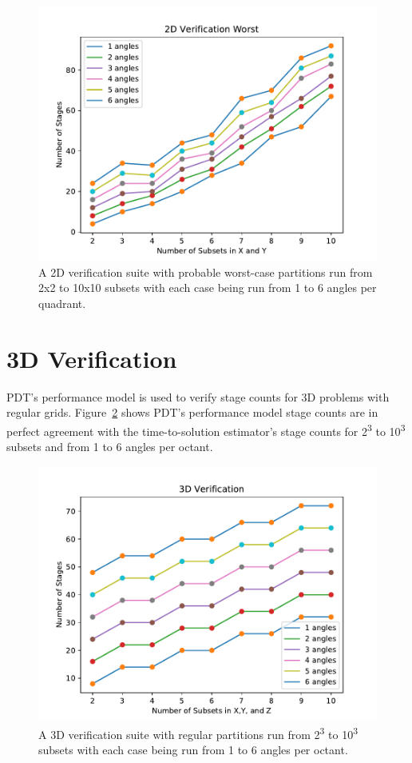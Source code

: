 \begin{figure}[H]
\centering
\includegraphics[scale=0.8]{../figures/worst_verification.pdf}
\caption{A 2D verification suite with probable worst-case partitions run from 2x2 to 10x10 subsets with each case being run from 1 to 6 angles per quadrant.}
\label{worst_verification}
\end{figure}

\section{3D Verification}
PDT's performance model is used to verify stage counts for 3D problems with regular grids.
Figure~\ref{3d_verification} shows PDT's performance model stage counts are in perfect agreement with the time-to-solution estimator's stage counts for 2\textsuperscript{3} to 10\textsuperscript{3} subsets and from 1 to 6 angles per octant.

\begin{figure}[H]
\centering
\includegraphics[scale=0.8]{../figures/3d_verification.pdf}
\caption{A 3D verification suite with regular partitions run from 2\textsuperscript{3} to 10\textsuperscript{3} subsets with each case being run from 1 to 6 angles per octant.}
\label{3d_verification}
\end{figure}


